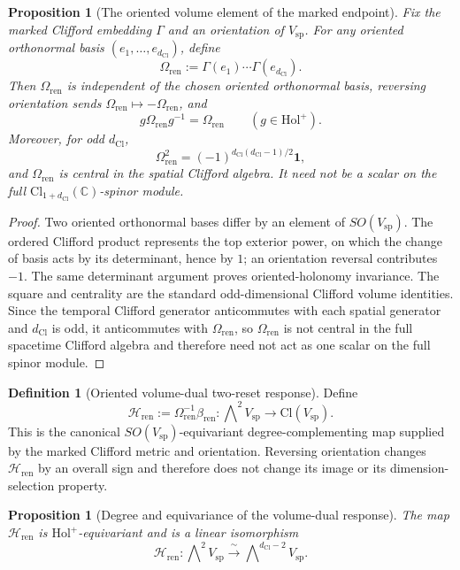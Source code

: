 \documentclass[11pt]{article}
\newtheorem{proposition}[theorem]{Proposition}
\theoremstyle{definition}
\newtheorem{definition}[theorem]{Definition}
\theoremstyle{remark}
\newcommand{\C}{\mathbb{C}}
\newcommand{\Cl}{\mathrm{Cl}}
\newcommand{\dCl}{d_{\mathrm{Cl}}}
\newcommand{\one}{\mathbf{1}}
\newcommand{\Vsp}{V_{\mathrm{sp}}}
\newcommand{\Holp}{\mathrm{Hol}^{+}}
\newcommand{\Volr}{\Omega_{\mathrm{ren}}}
\newcommand{\Hren}{\mathcal{H}_{\mathrm{ren}}}
\newcommand{\bren}{\beta_{\mathrm{ren}}}
\begin{document}
\begin{proposition}[The oriented volume element of the marked endpoint]
\label{prop:renewal-volume-element}
Fix the marked Clifford embedding \(\Gamma\) and an orientation of \(\Vsp\). For
any oriented orthonormal basis \((e_1,\ldots,e_{\dCl})\), define
\[
  \Volr:=\Gamma(e_1)\cdots\Gamma(e_{\dCl}).
\]
Then \(\Volr\) is independent of the chosen oriented orthonormal basis, reversing
orientation sends \(\Volr\mapsto-\Volr\), and
\[
  g\Volr g^{-1}=\Volr\qquad(g\in\Holp).
\]
Moreover, for odd \(\dCl\),
\[
  \Volr^2=(-1)^{\dCl(\dCl-1)/2}\one,
\]
and \(\Volr\) is central in the spatial Clifford algebra. It need not be a
scalar on the full \(\Cl_{1+\dCl}(\C)\)-spinor module.
\end{proposition}

\begin{proof}
Two oriented orthonormal bases differ by an element of \(SO(\Vsp)\). The ordered
Clifford product represents the top exterior power, on which the change of basis
acts by its determinant, hence by \(1\); an orientation reversal contributes
\(-1\). The same determinant argument proves oriented-holonomy invariance.
The square and centrality are the standard odd-dimensional Clifford volume
identities. Since the temporal Clifford generator anticommutes with each spatial
generator and \(\dCl\) is odd, it anticommutes with \(\Volr\), so \(\Volr\) is
not central in the full spacetime Clifford algebra and therefore need not act as
one scalar on the full spinor module.
\end{proof}

\begin{definition}[Oriented volume-dual two-reset response]
\label{def:volume-dual-response}
Define
\[
  \Hren:=\Volr^{-1}\bren:
  \bigwedge\nolimits^2\Vsp\longrightarrow\Cl(\Vsp).
\]
This is the canonical \(SO(\Vsp)\)-equivariant degree-complementing map supplied
by the marked Clifford metric and orientation. Reversing orientation changes
\(\Hren\) by an overall sign and therefore does not change its image or its
dimension-selection property.
\end{definition}

\begin{proposition}[Degree and equivariance of the volume-dual response]
\label{prop:volume-dual-degree}
The map \(\Hren\) is \(\Holp\)-equivariant and is a linear isomorphism
\[
  \Hren:
  \bigwedge\nolimits^2\Vsp
  \xrightarrow{\ \sim\ }
  \bigwedge\nolimits^{\dCl-2}\Vsp.
\]
\end{proposition}
\end{document}
